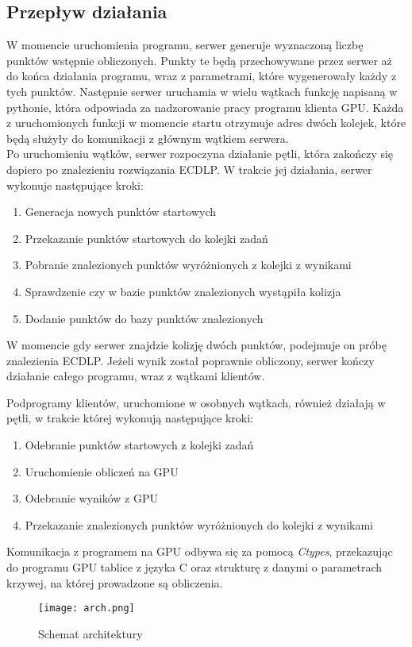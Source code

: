 \subsection{Przepływ działania}
W momencie uruchomienia programu, serwer generuje wyznaczoną liczbę punktów wstępnie obliczonych.
Punkty te będą przechowywane przez serwer aż do końca działania programu, wraz z parametrami, które
wygenerowały każdy z tych punktów. Następnie serwer uruchamia w wielu wątkach funkcję napisaną w pythonie, która
odpowiada za nadzorowanie pracy programu klienta GPU. Każda z uruchomionych funkcji w momencie startu
otrzymuje adres dwóch kolejek, które będą służyły do komunikacji z głównym wątkiem serwera. \\
Po uruchomieniu wątków, serwer rozpoczyna działanie pętli, która zakończy się dopiero po znalezieniu
rozwiązania ECDLP. W trakcie jej działania, serwer wykonuje następujące kroki:
\begin{enumerate}
    \item Generacja nowych punktów startowych
    \item Przekazanie punktów startowych do kolejki zadań
    \item Pobranie znalezionych punktów wyróżnionych z kolejki z wynikami
    \item Sprawdzenie czy w bazie punktów znalezionych wystąpiła kolizja
    \item Dodanie punktów do bazy punktów znalezionych
\end{enumerate}
W momencie gdy serwer znajdzie kolizję dwóch punktów, podejmuje on próbę znalezienia ECDLP.
Jeżeli wynik został poprawnie obliczony, serwer kończy działanie całego programu, wraz z wątkami klientów.
\par
Podprogramy klientów, uruchomione w osobnych wątkach,
również działają w pętli, w trakcie której wykonują następujące kroki:
\begin{enumerate}
    \item Odebranie punktów startowych z kolejki zadań
    \item Uruchomienie obliczeń na GPU
    \item Odebranie wyników z GPU
    \item Przekazanie znalezionych punktów wyróżnionych do kolejki z wynikami
\end{enumerate}
Komunikacja z programem na GPU odbywa się za pomocą \textit{Ctypes}, przekazując
do programu GPU tablice z języka C oraz strukturę z danymi o parametrach krzywej,
na której prowadzone są obliczenia.
\begin{figure}[!h]
    \centering \texttt{[image: arch.png]}
    \caption{Schemat architektury}
\end{figure}
